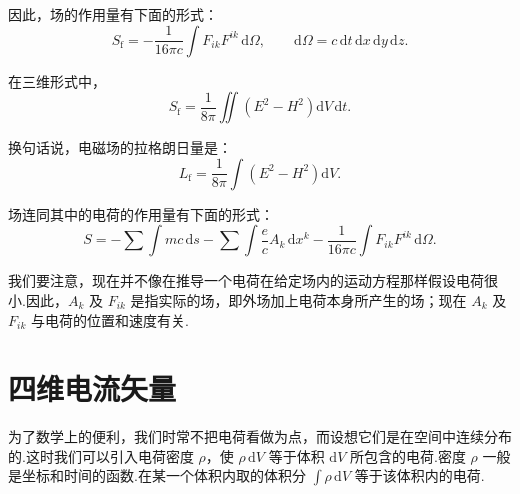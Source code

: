 因此，场的作用量有下面的形式：
\begin{equation}
  S_{\mathrm{f}}=-\frac{1}{16\pi c}\int F_{ik}F^{ik}\,\mathrm{d}\varOmega,
  \qquad \mathrm{d}\varOmega=c\,\mathrm{d}t\,\mathrm{d}x\,\mathrm{d}y\,\mathrm{d}z.
\end{equation}

在三维形式中，
\begin{equation}
  S_{\mathrm{f}}=\frac{1}{8\pi}\iint\left(E^2-H^2\right)\mathrm{d}V\,\mathrm{d}t.
\end{equation}

换句话说，电磁场的拉格朗日量是：
\begin{equation}
  L_{\mathrm{f}}=\frac{1}{8\pi}\int\left(E^2-H^2\right)\mathrm{d}V.
\end{equation}

场连同其中的电荷的作用量有下面的形式：
\begin{equation}
  S=-\sum\int mc\,\mathrm{d}s-\sum\int\frac{e}{c}A_k\,\mathrm{d}x^k
  -\frac{1}{16\pi c}\int F_{ik}F^{ik}\,\mathrm{d}\varOmega.
\end{equation}

我们要注意，现在并不像在推导一个电荷在给定场内的运动方程那样假设电荷很小.因此，$A_k$ 及 $F_{ik}$
是指实际的场，即外场加上电荷本身所产生的场；现在 $A_k$ 及 $F_{ik}$ 与电荷的位置和速度有关.

\section{四维电流矢量}

为了数学上的便利，我们时常不把电荷看做为点，而设想它们是在空间中连续分布的.这时我们可以引入电荷密度
$\rho$，使 $\rho\,\mathrm{d}V$ 等于体积 $\mathrm{d}V$ 所包含的电荷.密度 $\rho$
一般是坐标和时间的函数.在某一个体积内取的体积分 $\int\rho\,\mathrm{d}V$ 等于该体积内的电荷.

